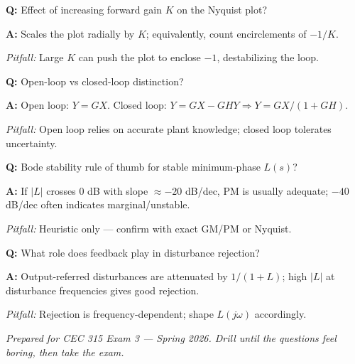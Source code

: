 \documentclass[11pt]{article}
\newcommand{\Q}[1]{\par\medskip\noindent\textbf{Q:} #1}
\newcommand{\A}[1]{\par\noindent\textbf{A:} #1}
\newcommand{\Pit}[1]{\par\noindent\textit{Pitfall:} #1}
\begin{document}
\Q{Effect of increasing forward gain $K$ on the Nyquist plot?}
\A{Scales the plot radially by $K$; equivalently, count encirclements of $-1/K$.}
\Pit{Large $K$ can push the plot to enclose $-1$, destabilizing the loop.}

\Q{Open-loop vs closed-loop distinction?}
\A{Open loop: $Y=GX$. Closed loop: $Y = GX - GHY \Rightarrow Y = GX/(1+GH)$.}
\Pit{Open loop relies on accurate plant knowledge; closed loop tolerates uncertainty.}

\Q{Bode stability rule of thumb for stable minimum-phase $L(s)$?}
\A{If $|L|$ crosses $0$ dB with slope $\approx -20$ dB/dec, PM is usually adequate; $-40$ dB/dec often indicates marginal/unstable.}
\Pit{Heuristic only --- confirm with exact GM/PM or Nyquist.}

\Q{What role does feedback play in disturbance rejection?}
\A{Output-referred disturbances are attenuated by $1/(1+L)$; high $|L|$ at disturbance frequencies gives good rejection.}
\Pit{Rejection is frequency-dependent; shape $L(j\omega)$ accordingly.}

\bigskip
\begin{center}
\textit{Prepared for CEC 315 Exam 3 --- Spring 2026. Drill until the questions feel boring, then take the exam.}
\end{center}
\end{document}
